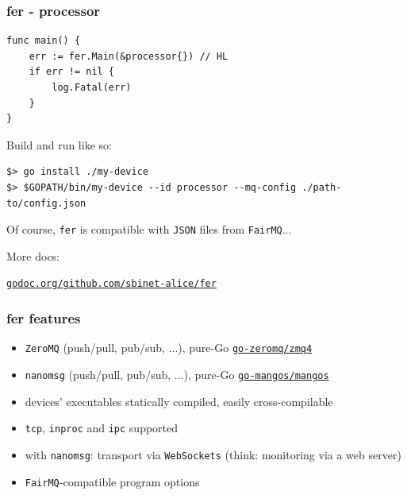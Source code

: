 \documentclass[9pt]{beamer}
\newcommand{\myblue} [1] {{\color{blue}#1}}
\begin{document}
\begin{frame}[fragile]
\frametitle{fer - processor}


\begin{verbatim}
func main() {
	err := fer.Main(&processor{}) // HL
	if err != nil {
		log.Fatal(err)
	}
}

\end{verbatim}

Build and run like so:



\begin{verbatim}
$> go install ./my-device
$> $GOPATH/bin/my-device --id processor --mq-config ./path-to/config.json

\end{verbatim}


Of course, \texttt{fer} is compatible with \texttt{JSON} files from \texttt{FairMQ}...


More docs:


\myblue{\href{https://godoc.org/github.com/sbinet-alice/fer}{\texttt{godoc.org/github.com/sbinet-alice/fer}}}


\end{frame}

\begin{frame}[fragile]
\frametitle{fer features}


\begin{itemize}
\item \texttt{ZeroMQ} (push/pull, pub/sub, ...), pure-Go \myblue{\href{https://github.com/go-zeromq/zmq4}{\texttt{go-zeromq/zmq4}}}
\item \texttt{nanomsg} (push/pull, pub/sub, ...), pure-Go \myblue{\href{https://github.com/go-mangos/mangos}{\texttt{go-mangos/mangos}}}
\item devices' executables statically compiled, easily cross-compilable
\item \texttt{tcp}, \texttt{inproc} and \texttt{ipc} supported
\item with \texttt{nanomsg}: transport via \texttt{WebSockets} (think: monitoring via a web server)
\item \texttt{FairMQ}-compatible program options
\end{itemize}


\end{frame}
\end{document}
